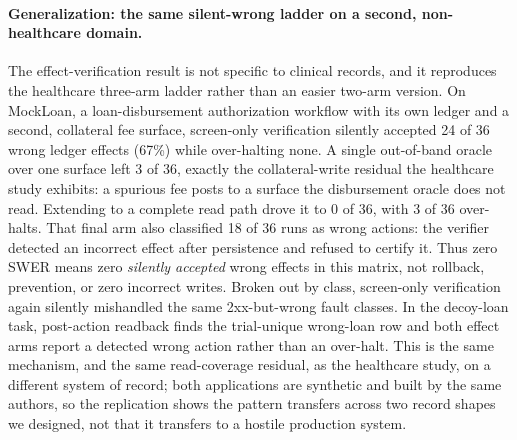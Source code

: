 \paragraph{Generalization: the same silent-wrong ladder on a second,
non-healthcare domain.} The effect-verification result is not specific to
clinical records, and it reproduces the healthcare three-arm ladder rather than
an easier two-arm version. On MockLoan, a loan-disbursement authorization
workflow with its own ledger and a second, collateral fee surface, screen-only
verification silently accepted 24 of 36 wrong ledger effects (67\%) while
over-halting none. A single out-of-band oracle over one surface left 3 of 36,
exactly the collateral-write residual the healthcare study exhibits: a spurious
fee posts to a surface the disbursement oracle does not read. Extending to a
complete read path drove it to 0 of 36, with 3 of 36 over-halts.
That final arm also classified 18 of 36 runs as wrong actions: the verifier
detected an incorrect effect after persistence and refused to certify it. Thus
zero SWER means zero \emph{silently accepted} wrong effects in this matrix, not
rollback, prevention, or zero incorrect writes.
Broken out by class, screen-only verification again silently mishandled the same
2xx-but-wrong fault classes. In the decoy-loan task, post-action readback finds
the trial-unique wrong-loan row and both effect arms report a detected wrong
action rather than an over-halt. This is the same mechanism, and the same read-coverage
residual, as the healthcare study, on a different system of record; both
applications are synthetic and built by the same authors, so the replication
shows the pattern transfers across two record shapes we designed, not that it
transfers to a hostile production system.

